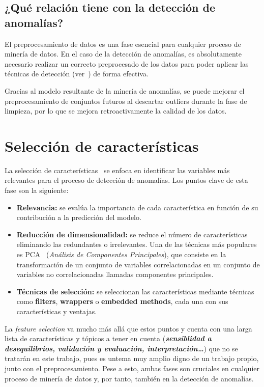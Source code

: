 \subsection{¿Qué relación tiene con la detección de anomalías?}
El preprocesamiento de datos es una fase esencial para cualquier proceso de minería de datos. En
el caso de la detección de anomalías, es absolutamente necesario realizar un correcto preprocesado
de los datos para poder aplicar las técnicas de detección (ver~) de forma
efectiva.~\cite{ramirez2022cleaning}

Gracias al modelo resultante de la minería de anomalías, se puede mejorar el preprocesamiento de
conjuntos futuros al descartar outliers durante la fase de limpieza, por lo que se mejora
retroactivamente la calidad de los datos.

\section{Selección de características}\label{sec:feat}
La selección de características~\cite{guyon2003introduction} se enfoca en identificar las variables más relevantes para el
proceso de detección de anomalías. Los puntos clave de esta fase son la siguiente:

\begin{itemize}
	\item \textbf{Relevancia:} se evalúa la importancia de cada característica en
		función de su contribución a la predicción del modelo.
	\item \textbf{Reducción de dimensionalidad:} se reduce el número de características
		eliminando las redundantes o irrelevantes. Una de las técnicas más populares es
		PCA~\cite{wold1987principal} (\textit{Análisis de Componentes Principales}), que
		consiste en la transformación de un conjunto de variables correlacionadas en un
		conjunto de variables no correlacionadas llamadas componentes principales.
	\item \textbf{Técnicas de selección:} se seleccionan las características mediante
		técnicas como \textbf{filters}, \textbf{wrappers} o \textbf{embedded methods},
		cada una con sus características y ventajas.
\end{itemize}

La \textit{feature selection} va mucho más allá que estos puntos y cuenta con una larga lista de
características y tópicos a tener en cuenta (\textit{\textbf{sensiblidad a desequilibrios, validación
y evaluación, interpretación\ldots}}) que no se tratarán en este trabajo, pues es untema muy
amplio digno de un trabajo propio, junto con el preprocesamiento. Pese a esto, ambas fases son
cruciales en cualquier proceso de minería de datos y, por tanto, también en la detección de anomalías.
